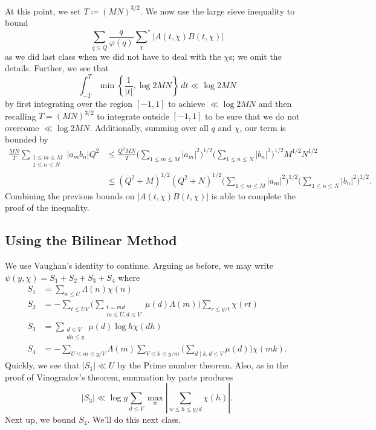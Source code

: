 \documentclass[../notes.tex]{subfiles}
\begin{document}
At this point, we set $T\coloneqq(MN)^{3/2}$. We now use the large sieve inequality to bound
\[\sum_{q\le Q}\frac q{\varphi(q)}{\sum_\chi}^*|A(t,\chi)B(t,\chi)|\]
as we did last class when we did not have to deal with the $\chi$s; we omit the details. Further, we see that
\[\int_{-T}^T\min\left\{\frac1{|t|},\log2MN\right\}\,dt\ll\log2MN\]
by first integrating over the region $[-1,1]$ to achieve $\ll\log2MN$ and then recalling $T=(MN)^{3/2}$ to integrate outside $[-1,1]$ to be sure that we do not overcome $\ll\log2MN$. Additionally, summing over all $q$ and $\chi$, our term is bounded by
\begin{align*}
	\frac{MN}T\sum_{\substack{1\le m\le M\\1\le n\le N}}|a_mb_n|Q^2 &\le \frac{Q^2MN}T\Bigg(\sum_{1\le m\le M}|a_m|^2\Bigg)^{1/2}\Bigg(\sum_{1\le n\le N}|b_n|^2\Bigg)^{1/2}M^{1/2}N^{1/2} \\
	&\le \left(Q^2+M\right)^{1/2}\left(Q^2+N\right)^{1/2}\Bigg(\sum_{1\le m\le M}|a_m|^2\Bigg)^{1/2}\Bigg(\sum_{1\le n\le N}|b_n|^2\Bigg)^{1/2}.
\end{align*}
Combining the previous bounds on $|A(t,\chi)B(t,\chi)|$ is able to complete the proof of the inequality.

\subsection{Using the Bilinear Method}
We use Vaughan's identity to continue. Arguing as before, we may write $\psi(y,\chi)=S_1+S_2+S_3+S_4$ where
\begin{align*}
	S_1 &= \sum_{n\le U}\Lambda(n)\chi(n) \\
	S_2 &= -\sum_{t\le UV}\Bigg(\sum_{\substack{t=md\\m\le U,d\le V}}\mu(d)\Lambda(m)\Bigg)\sum_{r\le y/t}\chi(rt) \\
	S_3 &= \sum_{\substack{d\le V\\dh\le y}}\mu(d)\log h\chi(dh) \\
	S_4 &= -\sum_{U\le m\le y/V}\Lambda(m)\sum_{V\le k\le y/m}\Bigg(\sum_{d\mid k,d\le V}\mu(d)\Bigg)\chi(mk).
\end{align*}
Quickly, we see that $|S_1|\ll U$ by the Prime number theorem. Also, as in the proof of Vinogradov's theorem, summation by parts produces
\[|S_3|\ll\log y\sum_{d\le V}\max_w\left|\sum_{w\le h\le y/d}\chi(h)\right|.\]
Next up, we bound $S_4$. We'll do this next class.
\end{document}
